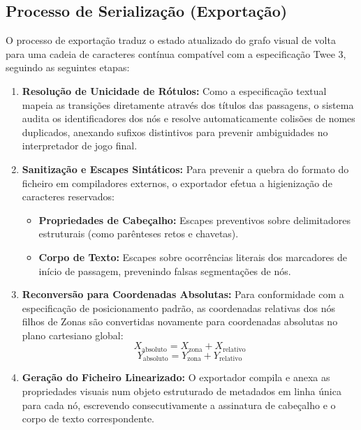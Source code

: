 \subsection{Processo de Serialização (Exportação)}
O processo de exportação traduz o estado atualizado do grafo visual de volta para uma cadeia de caracteres contínua compatível com a especificação Twee 3, seguindo as seguintes etapas:
\begin{enumerate}
    \item \textbf{Resolução de Unicidade de Rótulos:} Como a especificação textual mapeia as transições diretamente através dos títulos das passagens, o sistema audita os identificadores dos nós e resolve automaticamente colisões de nomes duplicados, anexando sufixos distintivos para prevenir ambiguidades no interpretador de jogo final.
    
    \item \textbf{Sanitização e Escapes Sintáticos:} Para prevenir a quebra do formato do ficheiro em compiladores externos, o exportador efetua a higienização de caracteres reservados:
    \begin{itemize}
        \item \textbf{Propriedades de Cabeçalho:} Escapes preventivos sobre delimitadores estruturais (como parênteses retos e chavetas).
        
        \item \textbf{Corpo de Texto:} Escapes sobre ocorrências literais dos marcadores de início de passagem, prevenindo falsas segmentações de nós.
    \end{itemize}
    
    \item \textbf{Reconversão para Coordenadas Absolutas:} Para conformidade com a especificação de posicionamento padrão, as coordenadas relativas dos nós filhos de Zonas são convertidas novamente para coordenadas absolutas no plano cartesiano global:
    \[
    X_{\text{absoluto}} = X_{\text{zona}} + X_{\text{relativo}}
    \]
    \[
    Y_{\text{absoluto}} = Y_{\text{zona}} + Y_{\text{relativo}}
    \]
    
    \item \textbf{Geração do Ficheiro Linearizado:} O exportador compila e anexa as propriedades visuais num objeto estruturado de metadados em linha única para cada nó, escrevendo consecutivamente a assinatura de cabeçalho e o corpo de texto correspondente.
\end{enumerate}

